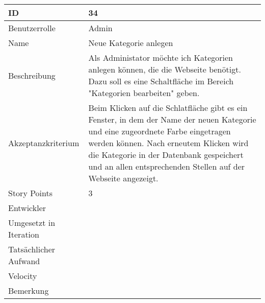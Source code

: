 \begin{tabularx}{\textwidth}{|p{}|X|}
	\hline
	ID & 34\\
	\hline
	Benutzerrolle & Admin\\
	\hline
	Name & Neue Kategorie anlegen\\
	\hline
	Beschreibung & Als Administator möchte ich Kategorien anlegen können, die die Webseite benötigt. Dazu soll es eine Schaltfläche im Bereich "Kategorien bearbeiten" geben.\\
	\hline
	Akzeptanzkriterium & Beim Klicken auf die Schlatfläche gibt es ein Fenster, in dem der Name der neuen Kategorie und eine zugeordnete Farbe eingetragen werden können. Nach erneutem Klicken wird die Kategorie in der Datenbank gespeichert und an allen entsprechenden Stellen auf der Webseite angezeigt.\\
	\hline
	Story Points & 3 \\
	\hline
	Entwickler & \\
	\hline
	Umgesetzt in Iteration & \\
	\hline
	Tatsächlicher Aufwand & \\
	\hline
	Velocity & \\
	\hline
	Bemerkung & \\
	\hline
\end{tabularx}
\vspace{20pt}
